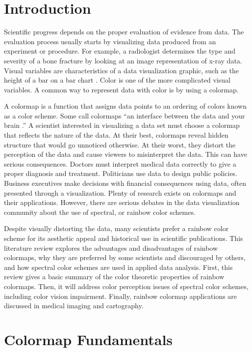 \documentclass[journal]{IEEEtran}
\begin{document}
\section{Introduction}
Scientific progress depends on the proper evaluation
of evidence from data. The evaluation process usually
starts by visualizing data produced from an experiment
or procedure. For example, a radiologist determines the
type and severity of a bone fracture by looking at an
image representation of x-ray data. Visual variables are
characteristics of a data visualization graphic, such as
the height of a bar on a bar chart 
\cite{visvars, colorchoice, colorguidelines}.
Color is one of the more complicated visual variables. 
A common way to represent data with color is by using a colormap.
\par
A colormap is a function that assigns data points to
an ordering of colors known as a color scheme. Some
call colormaps “an interface between the data and your
brain \cite{viridis}.” A scientist interested in visualizing a
data set must choose a colormap that reflects the nature of the data. 
At their best, colormaps reveal hidden structure that would go unnoticed
otherwise. At their worst, they distort the perception of the data and
cause viewers to misinterpret the data. This can have
serious consequences. Doctors must interpret medical
data correctly to give a proper diagnosis and treatment.
Politicians use data to design public policies. Business
executives make decisions with financial consequences
using data, often presented through a visualization.
Plenty of research exists on colormaps and
their applications. However, there are serious debates in the data
visualization community about the use of spectral, or
rainbow color schemes.
\par
Despite visually distorting the data, many scientists
prefer a rainbow color scheme for its aesthetic appeal
and historical use in scientific publications. This literature
review explores the advantages and disadvantages
of rainbow colormaps, why they are preferred by some
scientists and discouraged by others, and how spectral color schemes are used
in applied data analysis. First, this review gives a basic summary 
of the color theoretic properties of rainbow colormaps. Then, it will
address color perception issues of spectral color schemes, including
color vision impairment. Finally, rainbow colormap applications are discussed
in medical imaging and cartography.

\section{Colormap Fundamentals}
\end{document}
